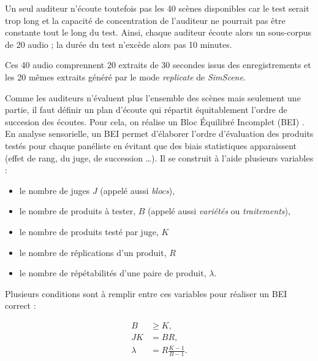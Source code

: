 


Un seul auditeur n'écoute toutefois pas les 40 scènes disponibles car le test serait trop long et la capacité de concentration de l'auditeur ne pourrait pas être constante tout le long du test. Ainsi, chaque auditeur écoute alors un sous-corpus de 20 audio ; la durée du test n'excède alors pas 10 minutes. 

Ces 40 audio comprennent 20 extraits de 30 secondes issus des enregistrements et les 20 mêmes extraits généré par le mode \textit{replicate} de \textit{SimScene}. 



Comme les auditeurs n'évaluent plus l'ensemble des scènes mais seulement une partie, il faut définir un plan d'écoute qui répartit équitablement l'ordre de succesion des écoutes. Pour cela, on réalise un \og Bloc Équilibré Incomplet \fg{} (BEI) \cite{pages_blocs_2007}. \\


En analyse sensorielle, un BEI permet d'élaborer l'ordre d'évaluation des produits testés pour chaque panéliste en évitant que des biais statistiques apparaissent (effet de rang, du juge, de succession \dots). Il se construit à l'aide plusieurs variables :

\begin{itemize}
\item le nombre de juges $J$ (appelé aussi \textit{blocs}), 
\item le nombre de produits à tester, $B$ (appelé aussi \textit{variétés} ou \textit{traitements}),
\item le nombre de produits testé par juge, $K$
\item le nombre de réplications d'un produit, $R$
\item le nombre de répétabilités d'une paire de produit, $\lambda$.\\
\end{itemize}

Plusieurs conditions sont à remplir entre ces variables pour réaliser un BEI correct : 

\begin{subequations}\label{BIE_cond}
\begin{align}
B &\geq K, \label{eq:BIE_cond1}\\
JK &= BR, \label{eq:BIE_cond2}\\
\lambda &= R\frac{K-1}{B-1}. \label{eq:BIE_cond3}
\end{align}
\end{subequations}

